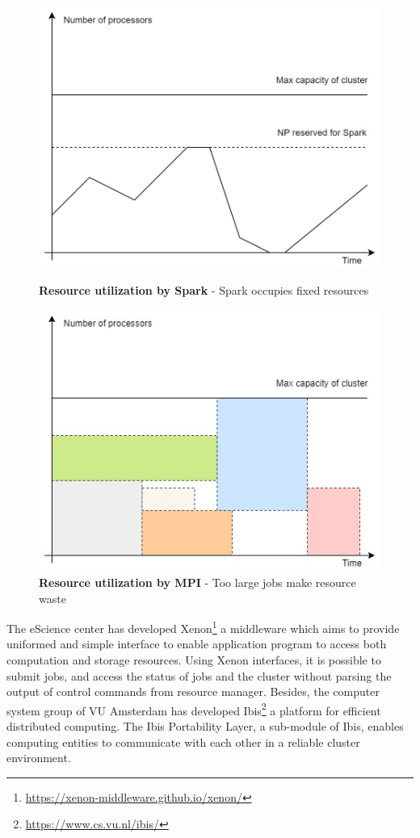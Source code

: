 \begin{figure}
    \centering
    \begin{minipage}{.5\textwidth}
      \centering
      \includegraphics[width=0.9\linewidth]{1_introduction/figures/spark_NP.jpg}
      \caption[SparkUti]{{\small\textbf{Resource utilization by Spark} - Spark occupies fixed resources}}
      \label{fig:sparkUti}
    \end{minipage}%
    \begin{minipage}{.5\textwidth}
      \centering
      \includegraphics[width=0.9\linewidth]{1_introduction/figures/MPI_batch.jpg}
      \caption[MPIUti]{{\small\textbf{Resource utilization by MPI} - Too large jobs make resource waste}}
      \label{fig:MPIUti}
    \end{minipage}
\end{figure}
The eScience center has developed Xenon\footnote{\url{https://xenon-middleware.github.io/xenon/}} a middleware which aims to provide uniformed and simple interface to enable application program to access both computation and storage resources.
Using Xenon interfaces, it is possible to submit jobs, and access the status of jobs and the cluster without parsing the output of control commands from resource manager. 
Besides, the computer system group of VU Amsterdam has developed Ibis\footnote{\url{https://www.cs.vu.nl/ibis/}} a platform  for efficient distributed computing. 
The Ibis Portability Layer, a sub-module of Ibis, enables computing entities to communicate with each other in a reliable cluster environment.

